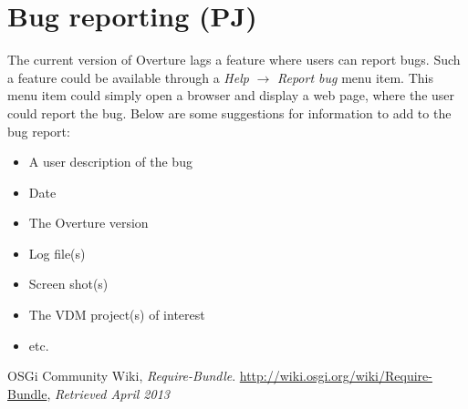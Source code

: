 \documentclass[11pt]{report}
\begin{document}
\section*{Bug reporting (PJ)}

The current version of Overture lags a feature where users can report bugs. Such a feature could be available through a \emph{Help} $ \rightarrow$ \emph{Report bug} menu item. This menu item could simply open a browser and display a web page, where the user could report the bug. Below are some suggestions for information to add to the bug report:

\begin{itemize}
\item A user description of the bug
\item Date
\item The Overture version
\item Log file(s)
\item Screen shot(s)
\item The VDM project(s) of interest
\item etc.
\end{itemize}

\begin{thebibliography}{9}

  OSGi Community Wiki,
  \emph{Require-Bundle}.
  \url{http://wiki.osgi.org/wiki/Require-Bundle},
  \emph{Retrieved April 2013}

\end{thebibliography}
\end{document}
